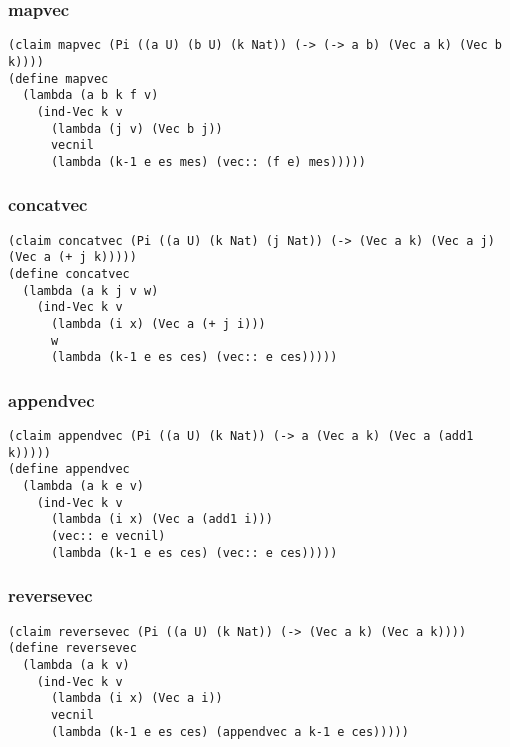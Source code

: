 \subsubsection{mapvec} \label{code:mapvec}
\begin{verbatim}
(claim mapvec (Pi ((a U) (b U) (k Nat)) (-> (-> a b) (Vec a k) (Vec b k))))
(define mapvec
  (lambda (a b k f v)
    (ind-Vec k v
      (lambda (j v) (Vec b j))
      vecnil
      (lambda (k-1 e es mes) (vec:: (f e) mes)))))
\end{verbatim}

\subsubsection{concatvec} \label{code:concatvec}
\begin{verbatim}
(claim concatvec (Pi ((a U) (k Nat) (j Nat)) (-> (Vec a k) (Vec a j) (Vec a (+ j k)))))
(define concatvec
  (lambda (a k j v w)
    (ind-Vec k v
      (lambda (i x) (Vec a (+ j i)))
      w
      (lambda (k-1 e es ces) (vec:: e ces)))))
\end{verbatim}

\subsubsection{appendvec} \label{code:appendvec}
\begin{verbatim}
(claim appendvec (Pi ((a U) (k Nat)) (-> a (Vec a k) (Vec a (add1 k)))))
(define appendvec
  (lambda (a k e v)
    (ind-Vec k v
      (lambda (i x) (Vec a (add1 i)))
      (vec:: e vecnil)
      (lambda (k-1 e es ces) (vec:: e ces)))))
\end{verbatim}

\subsubsection{reversevec} \label{code:reversevec}
\begin{verbatim}
(claim reversevec (Pi ((a U) (k Nat)) (-> (Vec a k) (Vec a k))))
(define reversevec
  (lambda (a k v)
    (ind-Vec k v
      (lambda (i x) (Vec a i))
      vecnil
      (lambda (k-1 e es ces) (appendvec a k-1 e ces)))))
\end{verbatim}

